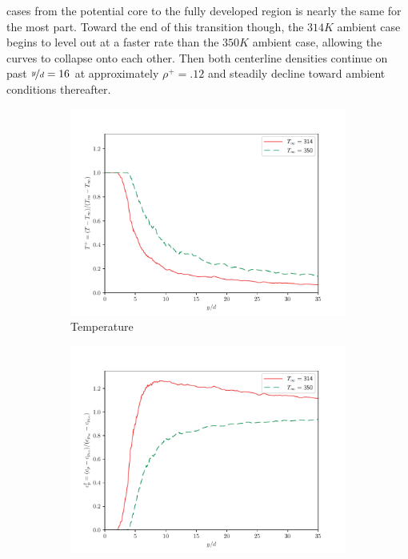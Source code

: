cases from the potential core to the fully developed region is nearly the same for the most part. Toward the end of this transition though,  the $314 K$ ambient case begins to level out at a faster rate than the $350 K$ ambient case, allowing the curves to collapse onto each other. Then both centerline densities continue on past $\nicefrac{y}{d} = 16$ at approximately $\rho^+ = .12$ and steadily decline toward ambient conditions thereafter. 
\begin{figure}[H]
\begin{center}
\begin{subfigure}{0.45\textwidth}
	\includegraphics[scale=.45]{figures/Plots/centerline/temp_centerline_scaled.pdf}
	\caption{Temperature} \label{noniso_temp_centerline_1}
\end{subfigure}
\begin{subfigure}{0.45\textwidth}
	\includegraphics[scale=.45]{figures/Plots/centerline/cp_centerline_scaled.pdf}

\end{subfigure}
\end{center}
\end{figure}
